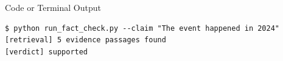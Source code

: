 \begin{frame}[fragile]{Code or Terminal Output}
\begin{lstlisting}[style=terminalstyle]
$ python run_fact_check.py --claim "The event happened in 2024"
[retrieval] 5 evidence passages found
[verdict] supported
\end{lstlisting}
\end{frame}

